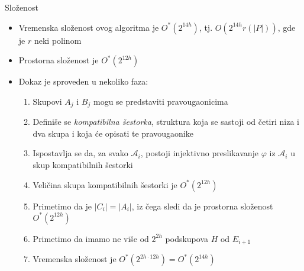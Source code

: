 \documentclass[10pt]{beamer}
\begin{document}
\begin{frame}{Složenost}
\begin{itemize}
    \item Vremenska složenost ovog algoritma je $O^*(2^{14h})$, tj. $O(2^{14h} r(|P|))$, gde je $r$ neki polinom
    \item Prostorna složenost je $O^*(2^{12h})$
    \item Dokaz je sproveden u nekoliko faza:
    \begin{enumerate}
        \item Skupovi $A_j$ i $B_j$ mogu se predstaviti pravougaonicima
        \item Definiše se \textit{kompatibilna šestorka}, struktura koja se sastoji od četiri niza i dva skupa i koja će opisati te pravougaonike
        \item Ispostavlja se da, za svako $\mathcal{A}_i$, postoji injektivno preslikavanje $\varphi$ iz $\mathcal{A}_i$ u skup kompatibilnih šestorki
        \item Veličina skupa kompatibilnih šestorki je $O^*(2^{12h})$
        \item Primetimo da je $|C_i| = |A_i|$, iz čega sledi da je prostorna složenost $O^*(2^{12h})$
        \item Primetimo da imamo ne više od $2^{2h}$ podskupova $H$ od $E_{i+1}$
        \item Vremenska složenost je $O^*(2^{2h \cdot 12h}) = O^*(2^{14h})$
    \end{enumerate}
\end{itemize}
    
\end{frame}
\end{document}
